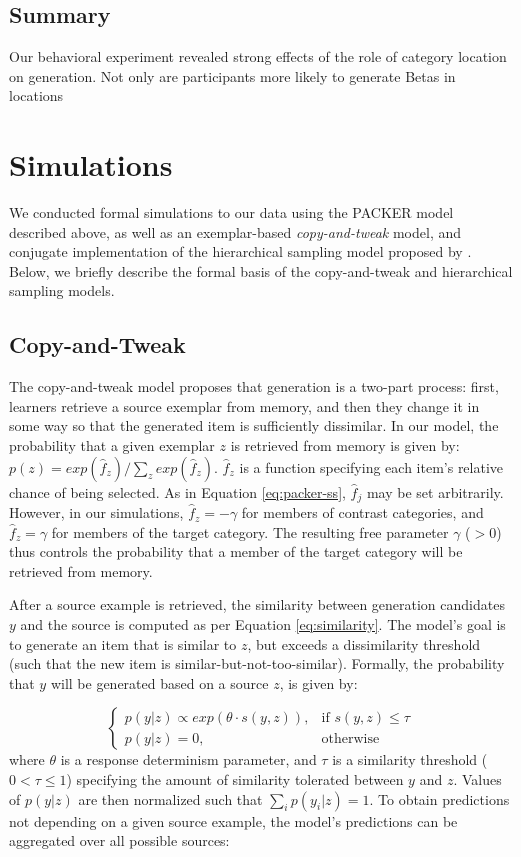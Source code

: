 \documentclass[10pt,letterpaper]{article}
\begin{document}
\subsection{Summary}

Our behavioral experiment revealed strong effects of the role of category location on generation. Not only are participants more likely to generate Betas in locations

\section{Simulations}

We conducted formal simulations to our data using the PACKER model described above, as well as an exemplar-based \textit{copy-and-tweak} model, and conjugate implementation of the hierarchical sampling model proposed by \citet{jern2013probabilistic}. Below, we briefly describe the formal basis of the copy-and-tweak and hierarchical sampling models.

\subsection{Copy-and-Tweak}
The copy-and-tweak model proposes that generation is a two-part process: first, learners retrieve a source exemplar from memory, and then they change it in some way so that the generated item is sufficiently dissimilar. In our model, the probability that a given exemplar $z$ is retrieved from memory is given by: $p(z) = exp(\hat{f}_z) / \sum_z{ exp(\hat{f}_z) }$. $\hat{f}_z$ is a function specifying each item's relative chance of being selected. As in Equation \ref{eq:packer-ss}, $\hat{f}_j$ may be set arbitrarily. However, in our simulations, $\hat{f}_z = -\gamma$ for members of contrast categories, and $\hat{f}_z = \gamma$ for members of the target category. The resulting free parameter $\gamma$ ($>0$) thus controls the probability that a member of the target category will be retrieved from memory.

After a source example is retrieved, the similarity between generation candidates $y$ and the source is computed as per Equation \ref{eq:similarity}. The model's goal is to generate an item that is similar to $z$, but exceeds a dissimilarity threshold (such that the new item is similar-but-not-too-similar). Formally, the probability that $y$ will be generated based on a source $z$, is given by:

\begin{equation}
  \begin{cases} 
    p(y|z) \propto exp(\theta \cdot s(y,z)), & \text{if } s(y,z) \leq \tau \\
    p(y|z) = 0, & \text{otherwise} 
  \end{cases} 
\end{equation}
where $\theta$ is a response determinism parameter, and $\tau$ is a similarity threshold ($0 < \tau \leq 1$) specifying the amount of similarity tolerated between $y$ and $z$. Values of $p(y|z)$ are then normalized such that $\sum_i{p(y_i|z)} = 1$. To obtain predictions not depending on a given source example, the model's predictions can be aggregated over all possible sources:
\end{document}
